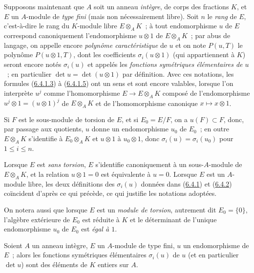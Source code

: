 \begin{env}[6.4.2]
\label{II.6.4.2-fr}
Supposons maintenant que $A$ soit un anneau \emph{intègre}, de corps des
fractions $K$, et $E$ un $A$-module de \emph{type fini} (mais non
nécessairement libre). Soit $n$ le \emph{rang} de $E$, c'est-à-dire le rang du
$K$-module libre $E\otimes_AK$~; à tout endomorphisme $u$ de $E$ correspond
canoniquement l'endomorphisme $u\otimes1$ de $E\otimes_AK$~; par abus de
langage, on appelle encore \emph{polynôme caractéristique} de $u$ et on note
$P(u,T)$ le polynôme $P(u\otimes1,T)$, dont les coefficients
$\sigma_i(u\otimes1)$ (qui appartiennent à $K$) seront encore notés
$\sigma_i(u)$ et appelés les \emph{fonctions symétriques élémentaires de
$u$}~; en particulier $\det u=\det(u\otimes1)$ par définition. Avec ces
notations, les formules (\hyperref[II.6.4.1.3-fr]{6.4.1.3}) à
(\hyperref[II.6.4.1.5-fr]{6.4.1.5}) ont un sens et sont encore valables,
lorsque l'on interprète $u^j$ comme l'homomorphisme $E\to E\otimes_AK$
composé de l'endomorphisme $u^j\otimes1=(u\otimes1)^j$ de $E\otimes_AK$ et
de l'homomorphisme canonique $x\mapsto x\otimes1$.

Si $F$ est le sous-module de torsion de $E$, et si $E_0=E/F$, on a
$u(F)\subset F$, donc, par passage aux quotients, $u$ donne un endomorphisme
$u_0$ de $E_0$~; en outre $E\otimes_AK$ s'identifie à $E_0\otimes_AK$ et
$u\otimes1$ à $u_0\otimes1$, donc $\sigma_i(u)=\sigma_i(u_0)$ pour
$1\leq i\leq n$.

Lorsque $E$ est \emph{sans torsion}, $E$ s'identifie canoniquement à un
sous-$A$-module de $E\otimes_AK$, et la relation $u\otimes1=0$ est
équivalente à $u=0$. Lorsque $E$ est un $A$-module libre, les deux définitions
des $\sigma_i(u)$ données dans (\hyperref[II.6.4.1-fr]{6.4.1}) et
(\hyperref[II.6.4.2-fr]{6.4.2}) coïncident d'après ce qui précède, ce qui
justifie les notations adoptées.

On notera aussi que lorsque $E$ est un \emph{module de torsion}, autrement dit
$E_0=\{0\}$, l'algèbre extérieure de $E_0$ est réduite à $K$ et le déterminant
de l'unique endomorphisme $u_0$ de $E_0$ est \emph{égal à $1$}.
\end{env}

\begin{proposition}[6.4.3]
\label{II.6.4.3-fr}
Soient $A$ un anneau intègre, $E$ un $A$-module de type fini, $u$ un
endomorphisme de $E$~; alors les fonctions symétriques élémentaires
$\sigma_i(u)$ de $u$ (et en particulier $\det u$) sont des éléments de $K$
entiers sur $A$.
\end{proposition}

